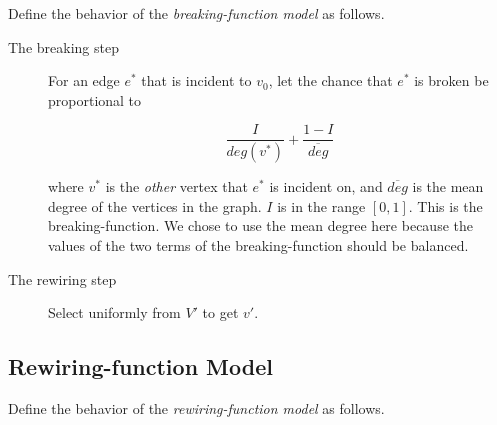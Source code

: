 \documentclass[a4paper,10pt]{article}
\begin{document}
Define the behavior of the \emph{breaking-function model} as follows.

\begin{description}
 \item[The breaking step]

 For an edge $e^*$ that is incident to $v_0$, let the chance that $e^*$ is broken be proportional to

 \begin{equation}
\label{eqn:breaking-function}
  \frac{I}{deg(v^*)} + \frac{1 - I}{\overline{deg}}
 \end{equation}

where $v^*$ is the \emph{other} vertex that $e^*$ is incident on, and $\overline{deg}$ is the mean degree of the vertices in the graph. $I$ is in the range $[0, 1]$. This is the breaking-function. We chose to use the mean degree here because the values of the two terms of the breaking-function should be balanced. 

 \item[The rewiring step] Select uniformly from $V'$ to get $v'$.
\end{description}

\subsection{Rewiring-function Model}

Define the behavior of the \emph{rewiring-function model} as follows.
\end{document}
